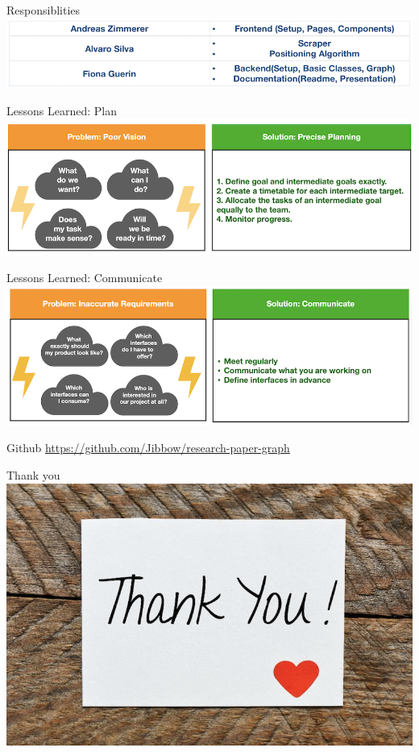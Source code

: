 \documentclass{beamer}
\begin{document}
\begin{frame}{Responsiblities}
    \includegraphics{img_10.png}
\end{frame}

\begin{frame}{Lessons Learned: Plan}
    \includegraphics{img_11.png}
\end{frame}

\begin{frame}{Lessons Learned: Communicate}
    \includegraphics{img_12.png}
\end{frame}

\begin{frame}{Github}
    \url{https://github.com/Jibbow/research-paper-graph}
\end{frame}

\begin{frame}{Thank you}
    \includegraphics{img_05.png}
\end{frame}
\end{document}
